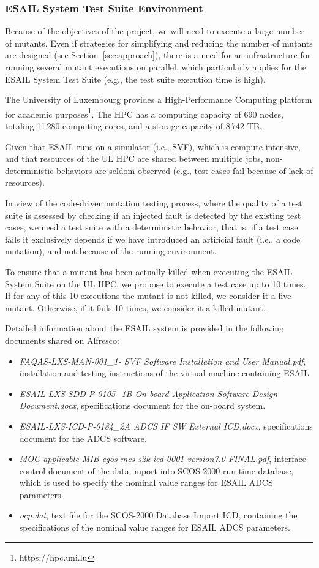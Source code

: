 \subsubsection{ESAIL System Test Suite Environment}

Because of the objectives of the project, we will need to execute a large number of mutants. Even if strategies for simplifying and reducing the number of mutants are designed (see Section~\ref{sec:approach}), there is a need for an infrastructure for running several mutant executions on parallel, which particularly applies for the ESAIL System Test Suite (e.g., the test suite execution time is high).

The University of Luxembourg provides a High-Performance Computing platform for academic purposes\footnote{https://hpc.uni.lu}.
The HPC has a computing capacity of 690 nodes, totaling 11\,280 computing cores, and a storage capacity of 8\,742 TB.

Given that ESAIL runs on a simulator (i.e., SVF), which is compute-intensive, and that resources of the UL HPC are shared between multiple jobs, non-deterministic behaviors are seldom observed (e.g., test cases fail because of lack of resources).

In view of the code-driven mutation testing process, where the quality of a test suite is assessed by checking if an injected fault is detected by the existing test cases, we need a test suite with a deterministic behavior, that is, if a test case fails it exclusively depends if we have introduced an artificial fault (i.e., a code mutation), and not because of the running environment.

To ensure that a mutant has been actually killed when executing the ESAIL System Suite on the UL HPC, we propose to execute a test case up to 10 times. If for any of this 10 executions the mutant is not killed, we consider it a live mutant. Otherwise, if it fails 10 times, we consider it a killed mutant.


Detailed information about the ESAIL system is provided in the following documents shared on Alfresco:

\begin{itemize}
	\item \emph{FAQAS-LXS-MAN-001\_1- SVF Software Installation and User Manual.pdf}, installation and testing instructions of the virtual machine containing ESAIL
	\item \emph{ESAIL-LXS-SDD-P-0105\_1B On-board Application Software Design Document.docx}, specifications document for the on-board system.
	\item \emph{ESAIL-LXS-ICD-P-0184\_2A ADCS IF SW External ICD.docx}, specifications document for the ADCS software.
	\item \emph{MOC-applicable MIB egos-mcs-s2k-icd-0001-version7.0-FINAL.pdf},  interface control document of the data import into SCOS-2000 run-time database, which is used to specify  the nominal value ranges for ESAIL ADCS parameters.
	\item \emph{ocp.dat}, text file for the SCOS-2000 Database Import ICD, containing the specifications of the nominal value ranges for ESAIL ADCS parameters.
\end{itemize}	


